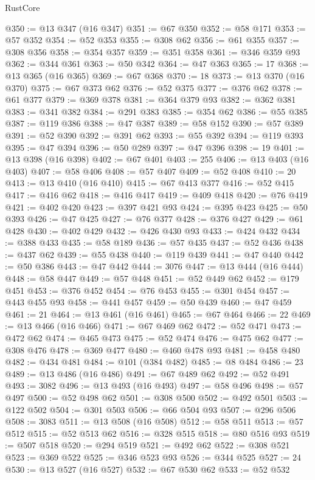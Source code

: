 \begin{lexlean}{RustCore}
\begin{coremodule}
@350 := @13 @347 (@16 @347)
@351 := @67 @350
@352 := @58 @171
@353 := @57 @352
@354 := @52 @353
@355 := @308 @62
@356 := @61 @355
@357 := @308 @356
@358 := @354 @357
@359 := @351 @358
@361 := @346 @359 @93
@362 := @344 @361
@363 := @50 @342
@364 := @47 @363
@365 := 17
@368 := @13 @365 (@16 @365)
@369 := @67 @368
@370 := 18
@373 := @13 @370 (@16 @370)
@375 := @67 @373 @62
@376 := @52 @375
@377 := @376 @62
@378 := @61 @377
@379 := @369 @378
@381 := @364 @379 @93
@382 := @362 @381
@383 := @341 @382
@384 := @291 @383
@385 := @354 @62
@386 := @55 @385
@387 := @119 @386
@388 := @47 @387
@389 := @58 @152
@390 := @57 @389
@391 := @52 @390
@392 := @391 @62
@393 := @55 @392
@394 := @119 @393
@395 := @47 @394
@396 := @50 @289
@397 := @47 @396
@398 := 19
@401 := @13 @398 (@16 @398)
@402 := @67 @401
@403 := 255
@406 := @13 @403 (@16 @403)
@407 := @58 @406
@408 := @57 @407
@409 := @52 @408
@410 := 20
@413 := @13 @410 (@16 @410)
@415 := @67 @413 @377
@416 := @52 @415
@417 := @416 @62
@418 := @416 @417
@419 := @409 @418
@420 := @76 @419
@421 := @402 @420
@423 := @397 @421 @93
@424 := @395 @423
@425 := @50 @393
@426 := @47 @425
@427 := @76 @377
@428 := @376 @427
@429 := @61 @428
@430 := @402 @429
@432 := @426 @430 @93
@433 := @424 @432
@434 := @388 @433
@435 := @58 @189
@436 := @57 @435
@437 := @52 @436
@438 := @437 @62
@439 := @55 @438
@440 := @119 @439
@441 := @47 @440
@442 := @50 @386
@443 := @47 @442
@444 := 3076
@447 := @13 @444 (@16 @444)
@448 := @58 @447
@449 := @57 @448
@451 := @52 @449 @62
@452 := @179 @451
@453 := @376 @452
@454 := @76 @453
@455 := @301 @454
@457 := @443 @455 @93
@458 := @441 @457
@459 := @50 @439
@460 := @47 @459
@461 := 21
@464 := @13 @461 (@16 @461)
@465 := @67 @464
@466 := 22
@469 := @13 @466 (@16 @466)
@471 := @67 @469 @62
@472 := @52 @471
@473 := @472 @62
@474 := @465 @473
@475 := @52 @474
@476 := @475 @62
@477 := @308 @476
@478 := @369 @477
@480 := @460 @478 @93
@481 := @458 @480
@482 := @434 @481
@484 := @101 (@384 @482)
@485 := @8 @484
@486 := 23
@489 := @13 @486 (@16 @486)
@491 := @67 @489 @62
@492 := @52 @491
@493 := 3082
@496 := @13 @493 (@16 @493)
@497 := @58 @496
@498 := @57 @497
@500 := @52 @498 @62
@501 := @308 @500
@502 := @492 @501
@503 := @122 @502
@504 := @301 @503
@506 := @66 @504 @93
@507 := @296 @506
@508 := 3083
@511 := @13 @508 (@16 @508)
@512 := @58 @511
@513 := @57 @512
@515 := @52 @513 @62
@516 := @328 @515
@518 := @80 @516 @93
@519 := @507 @518
@520 := @294 @519
@521 := @492 @62
@522 := @308 @521
@523 := @369 @522
@525 := @346 @523 @93
@526 := @344 @525
@527 := 24
@530 := @13 @527 (@16 @527)
@532 := @67 @530 @62
@533 := @52 @532

\end{coremodule}
\end{lexlean}
